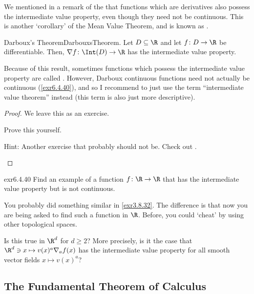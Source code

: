 We mentioned in a remark of the  that functions which are derivatives also possess the intermediate value property, even though they need not be continuous.  This is another `corollary' of the Mean Value Theorem, and is known as .
\begin{thm}{Darboux's Theorem}{DarbouxsTheorem}.
Let $D\subseteq \R$ and let $f\colon D\rightarrow \R$ be differentiable.  Then, $\nabla f\colon \Int (D)\rightarrow \R$ has the intermediate value property.
\begin{rmk}
Because of this result, sometimes functions which possess the intermediate value property are called .  However, Darboux continuous functions need not actually be continuous (\cref{exr6.4.40}), and so I recommend to just use the term ``intermediate value theorem'' instead (this term is also just more descriptive).
\end{rmk}
\begin{proof}
We leave this as an exercise.
\begin{exr}[breakable=false]{}{}
Prove this yourself.
\begin{rmk}
Hint:  Another exercise that probably should not be.  Check out \cite[pg.~144]{Pugh}.
\end{rmk}
\end{exr}
\end{proof}
\end{thm}
\begin{exr}{}{exr6.4.40}
Find an example of a function $f\colon \R \rightarrow \R$ that has the intermediate value property but is not continuous.
\begin{rmk}
You probably did something similar in \cref{exr3.8.32}.  The difference is that now you are being asked to find such a function in $\R$.  Before, you could `cheat' by using other topological spaces.
\end{rmk}
\end{exr}
\begin{exr}{}{}
Is this true in $\R ^d$ for $d\geq 2$?  More precisely, is it the case that $\R ^d\ni x\mapsto v(x)^a\nabla _af(x)$ has the intermediate value property for all smooth vector fields $x\mapsto v(x)^a$?
\end{exr}

\subsection{The Fundamental Theorem of Calculus}

